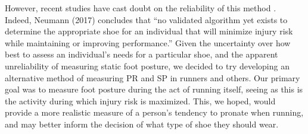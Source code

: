 However, recent studies have cast doubt on the reliability of this method \parencite{richards}.
Indeed, Neumann (2017) concludes that “no validated algorithm yet exists to determine the appropriate shoe for an individual that will minimize injury risk while maintaining or improving performance.”
Given the uncertainty over how best to assess an individual’s needs for a particular shoe, and the apparent unreliability of measuring static foot posture, we decided to try developing an alternative method of measuring PR and SP in runners and others.  Our primary goal was to measure foot posture during the act of running itself, seeing as this is the activity during which injury risk is maximized.  This, we hoped, would provide a more realistic measure of a person’s tendency to pronate when running, and may better inform the decision of what type of shoe they should wear.
